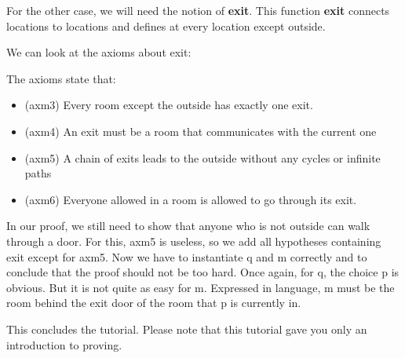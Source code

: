 For the other case, we will need the notion of \textbf{exit}. This function \textbf{exit} connects locations to locations and defines at every location except \textsf{outside}.

We can look at the axioms about \textsf{exit}:

\begin{description}
\AXIOMS
	\begin{description}
	\end{description}
\end{description}

The axioms state that:

\begin{itemize}
	\item (axm3) Every room except the outside has exactly one exit. 
	\item (axm4) An exit must be a room that communicates with the current one
	\item (axm5) A chain of exits leads to the outside without any cycles or infinite paths
	\item (axm6) Everyone allowed in a room is allowed to go through its exit. 
\end{itemize}  

In our proof, we still need to show that anyone who is not \textsf{outside} can walk through a door. For this, \textsf{axm5} is useless, so we add all hypotheses containing exit except for \textsf{axm5}. Now we have to instantiate \textsf{q} and \textsf{m} correctly and to conclude that the proof should not be too hard. Once again, for \textsf{q}, the choice \textsf{p} is obvious. But it is not quite as easy for \textsf{m}. Expressed in language, \textsf{m} must be the room behind the exit door of the room that \textsf{p} is currently in. 


This concludes the tutorial. Please note that this tutorial gave you only an introduction to proving.

